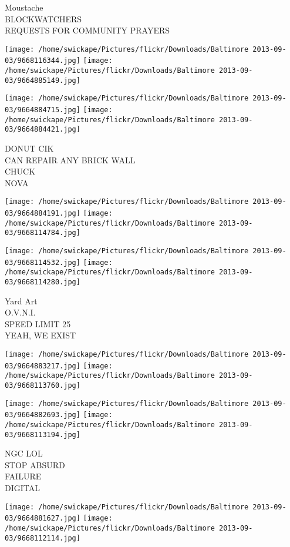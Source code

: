 \documentclass[10pt,letterpaper]{article}
\begin{document}
Moustache\\
BLOCKWATCHERS\\
REQUESTS FOR COMMUNITY PRAYERS
\pagebreak

\texttt{[image: /home/swickape/Pictures/flickr/Downloads/Baltimore 2013-09-03/9668116344.jpg]}
\texttt{[image: /home/swickape/Pictures/flickr/Downloads/Baltimore 2013-09-03/9664885149.jpg]}

\texttt{[image: /home/swickape/Pictures/flickr/Downloads/Baltimore 2013-09-03/9664884715.jpg]}
\texttt{[image: /home/swickape/Pictures/flickr/Downloads/Baltimore 2013-09-03/9664884421.jpg]}

DONUT CIK\\
CAN REPAIR ANY BRICK WALL\\
CHUCK\\
NOVA
\pagebreak

\texttt{[image: /home/swickape/Pictures/flickr/Downloads/Baltimore 2013-09-03/9664884191.jpg]}
\texttt{[image: /home/swickape/Pictures/flickr/Downloads/Baltimore 2013-09-03/9668114784.jpg]}

\texttt{[image: /home/swickape/Pictures/flickr/Downloads/Baltimore 2013-09-03/9668114532.jpg]}
\texttt{[image: /home/swickape/Pictures/flickr/Downloads/Baltimore 2013-09-03/9668114280.jpg]}

Yard Art\\
O.V.N.I.\\
SPEED LIMIT 25\\
YEAH, WE EXIST
\pagebreak

\texttt{[image: /home/swickape/Pictures/flickr/Downloads/Baltimore 2013-09-03/9664883217.jpg]}
\texttt{[image: /home/swickape/Pictures/flickr/Downloads/Baltimore 2013-09-03/9668113760.jpg]}

\texttt{[image: /home/swickape/Pictures/flickr/Downloads/Baltimore 2013-09-03/9664882693.jpg]}
\texttt{[image: /home/swickape/Pictures/flickr/Downloads/Baltimore 2013-09-03/9668113194.jpg]}

NGC LOL\\
STOP ABSURD\\
FAILURE\\
DIGITAL
\pagebreak

\texttt{[image: /home/swickape/Pictures/flickr/Downloads/Baltimore 2013-09-03/9664881627.jpg]}
\texttt{[image: /home/swickape/Pictures/flickr/Downloads/Baltimore 2013-09-03/9668112114.jpg]}
\end{document}
